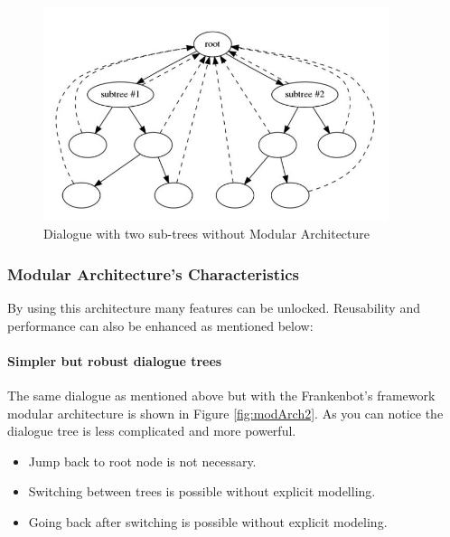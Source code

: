 \begin{figure}[!h]
    \centering
    \includegraphics[width=0.9\textwidth]{img/Modular_Architecture.PNG}
    \caption{Dialogue with two sub-trees without Modular Architecture}
    \label{fig:modArch}
\end{figure}

\subsubsection*{Modular Architecture's Characteristics}
By using this architecture many features can be unlocked. Reusability and performance can also be enhanced as mentioned below:

\paragraph*{Simpler but robust dialogue trees\label{par:simplerTree}}
The same dialogue as mentioned above but with the Frankenbot's framework modular architecture is shown in Figure \ref{fig:modArch2}. As you can notice the dialogue tree is less complicated and more powerful.
\begin{itemize}
\item Jump back to root node is not necessary.
\item Switching between trees is possible without explicit modelling.       
\item Going back after switching is possible without explicit modeling.
\end{itemize}

